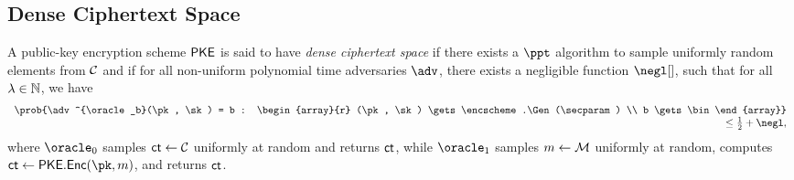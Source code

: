 \subsection{Dense Ciphertext Space}
\begin{definition}\label{def:dense-ctx-space}
	A public-key encryption scheme $\mathsf{PKE}$ is said to have \emph{dense ciphertext space} if there exists a $\ppt$ algorithm to sample uniformly random elements from $\mathcal{C}$ and if for all non-uniform polynomial time adversaries $\adv$, there exists a negligible function $\negl[]$, such that for all $\lambda \in \mathbb{N}$, we have
	\begin{equation*}
		\begin{array}{r}
			\prob{\adv^{\oracle_b}(\pk, \sk) = b : \begin{array}{r}
					(\pk, \sk) \gets \encscheme.\Gen(\secparam) \\
					b \gets \bin
				\end{array}} \\
			\le \frac{1}{2} + \negl,
		\end{array}
	\end{equation*}
	where $\oracle_0$ samples $\mathsf{ct} \gets \mathcal{C}$ uniformly at random and returns $\mathsf{ct}$, while $\oracle_1$ samples $m \gets \mathcal{M}$ uniformly at random, computes $\ct \gets \encscheme.\Enc(\pk, m)$, and returns $\mathsf{ct}$.
\end{definition}

